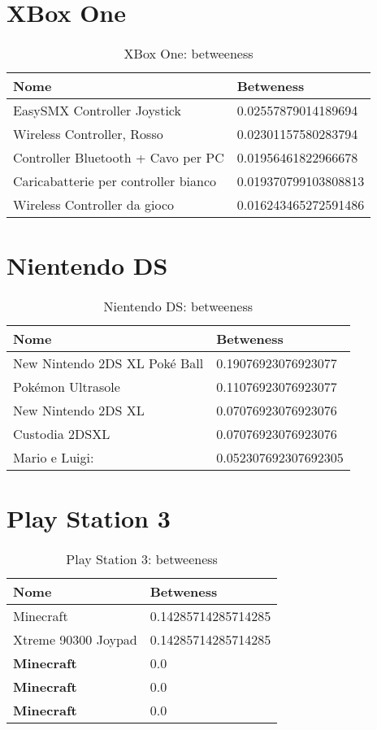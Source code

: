 	
	\section{XBox One}
		\begin{table}[H]
			\caption{XBox One: betweeness}
			\label{tab:xbox}
			\centering
			\begin{tabular}{ll}
				\toprule 
				\textbf{Nome} & \textbf{Betweness} \\
				\midrule
				EasySMX Controller Joystick  & 0.02557879014189694 \\
				Wireless Controller, Rosso  & 0.02301157580283794 \\
				Controller Bluetooth + Cavo per PC  & 0.01956461822966678 \\
				Caricabatterie per controller bianco & 0.019370799103808813 \\
				Wireless Controller da gioco & 0.016243465272591486 \\		
				\bottomrule
			\end{tabular}
		\end{table}
		
	\section{Nientendo DS}
		\begin{table}[H]
			\caption{Nientendo DS: betweeness}
			\label{tab:nientendoDS}
			\centering
			\begin{tabular}{ll}
				\toprule 
				\textbf{Nome} & \textbf{Betweness} \\
				\midrule
				New Nintendo 2DS XL Poké Ball  & 0.19076923076923077 \\
				Pokémon Ultrasole  & 0.11076923076923077 \\
				New Nintendo 2DS XL  & 0.07076923076923076 \\
				Custodia 2DSXL & 0.07076923076923076 \\
				Mario e Luigi: & 0.052307692307692305 \\		
				\bottomrule
			\end{tabular}
		\end{table}
	
	\section{Play Station 3}
		\begin{table}[H]
			\caption{Play Station 3: betweeness}
			\label{tab:ps3}
			\centering
			\begin{tabular}{ll}
				\toprule 
				\textbf{Nome} & \textbf{Betweness} \\
				\midrule
				Minecraft & 0.14285714285714285 \\
				Xtreme 90300 Joypad & 0.14285714285714285 \\
				\textbf{Minecraft}  & 0.0 \\
				\textbf{Minecraft} & 0.0 \\
				\textbf{Minecraft} & 0.0 \\		
				\bottomrule
			\end{tabular}
		\end{table}
	
